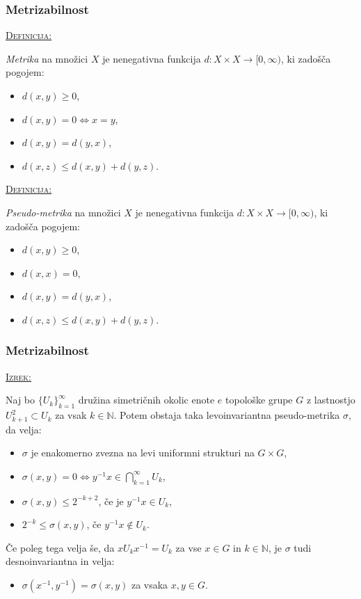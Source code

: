 \documentclass[a4paper, 12pt]{beamer}
\newenvironment{matematika}[1]{
\textcolor{bostonuniversityred}{\underline{\textsc{#1:}}}
}{
}
\begin{document}
\begin{frame}
\frametitle{Metrizabilnost}
\begin{matematika}{Definicija}
\emph{Metrika} na množici $X$ je nenegativna funkcija $d: X \times X \to [0,\infty)$, ki zadošča pogojem:
\begin{itemize}[label=]
\item $d(x, y) \geq 0$,
\item $d(x, y) = 0 \iff x = y$,
\item $d(x, y) = d(y, x)$,
\item $d(x, z) \leq d(x, y) + d(y, z)$.
\end{itemize}
\end{matematika}

\pause

\begin{matematika}{Definicija}
\emph{Pseudo-metrika} na množici $X$ je nenegativna funkcija $d: X \times X \to [0,\infty)$, ki zadošča pogojem:
\begin{itemize}[label=]
\item $d(x, y) \geq 0$,
\item $d(x, x) = 0$,
\item $d(x, y) = d(y, x)$,
\item $d(x, z) \leq d(x, y) + d(y, z)$.
\end{itemize}
\end{matematika}
\end{frame}

\begin{frame}
\frametitle{Metrizabilnost}
\begin{matematika}{Izrek}
Naj bo $\{ U_k \}_{k=1}^{\infty}$ družina simetričnih okolic enote $e$ topološke grupe $G$ z lastnostjo $U_{k+1}^2 \subset U_k$ za vsak $k\in\mathbb{N}$. Potem obstaja taka levoinvariantna pseudo-metrika $\sigma$, da velja:
\begin{itemize}[label=]
\item $\sigma$ je enakomerno zvezna na levi uniformni strukturi na $G \times G$,
\item $\sigma (x, y) = 0 \iff y^{-1}x \in \bigcap_{k=1}^{\infty}U_k$,
\item $\sigma (x, y) \leq 2^{-k+2}$, če je $y^{-1}x \in U_k$,
\item $2^{-k} \leq \sigma (x, y)$, če $y^{-1}x \notin U_k$.
\end{itemize}
Če poleg tega velja še, da $x U_k x^{-1} = U_k$ za vse $x \in G$ in $k\in\mathbb{N}$, je $\sigma$ tudi desnoinvariantna in velja:
\begin{itemize}[label=]
\item $\sigma (x^{-1}, y^{-1}) = \sigma (x, y)$ za vsaka $x, y \in G$.
\end{itemize}
\end{matematika}
\end{frame}
\end{document}
